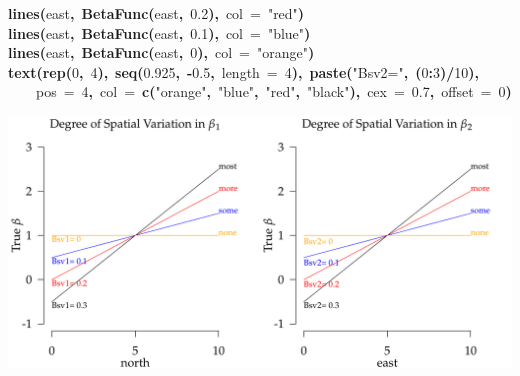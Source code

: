 \documentclass{article}
\makeatletter
\newcommand{\hlnumber}[1]{\textcolor[rgb]{0,0,0}{#1}}%
\newcommand{\hlfunctioncall}[1]{\textcolor[rgb]{0.501960784313725,0,0.329411764705882}{\textbf{#1}}}%
\newcommand{\hlstring}[1]{\textcolor[rgb]{0.6,0.6,1}{#1}}%
\newcommand{\hlkeyword}[1]{\textcolor[rgb]{0,0,0}{\textbf{#1}}}%
\newcommand{\hlargument}[1]{\textcolor[rgb]{0.690196078431373,0.250980392156863,0.0196078431372549}{#1}}%
\newcommand{\hlsymbol}[1]{\textcolor[rgb]{0,0,0}{#1}}%
\newcommand{\hlstd}[1]{\textcolor[rgb]{0,0,0}{#1}}%
\newenvironment{kframe}{%
 \def\FrameCommand##1{\hskip\@totalleftmargin \hskip-\fboxsep
 \colorbox{shadecolor}{##1}\hskip-\fboxsep
     \hskip-\linewidth \hskip-\@totalleftmargin \hskip\columnwidth}%
 \MakeFramed {\advance\hsize-\width
   \@totalleftmargin\z@ \linewidth\hsize
   \@setminipage}}%
 {\par\unskip\endMakeFramed}
\newenvironment{knitrout}{}{} %
\makeatother
\begin{document}
\begin{knitrout}
\begin{kframe}
\begin{flushleft}
\hlstd{}\hlfunctioncall{lines}\hlkeyword{(}\hlsymbol{east}\hlkeyword{,}{\ }\hlfunctioncall{BetaFunc}\hlkeyword{(}\hlsymbol{east}\hlkeyword{,}{\ }\hlnumber{0.2}\hlkeyword{)}\hlkeyword{,}{\ }\hlargument{col}{\ }\hlargument{=}{\ }\hlstring{"{}red"{}}\hlkeyword{)}\hspace*{\fill}\\
\hlstd{}\hlfunctioncall{lines}\hlkeyword{(}\hlsymbol{east}\hlkeyword{,}{\ }\hlfunctioncall{BetaFunc}\hlkeyword{(}\hlsymbol{east}\hlkeyword{,}{\ }\hlnumber{0.1}\hlkeyword{)}\hlkeyword{,}{\ }\hlargument{col}{\ }\hlargument{=}{\ }\hlstring{"{}blue"{}}\hlkeyword{)}\hspace*{\fill}\\
\hlstd{}\hlfunctioncall{lines}\hlkeyword{(}\hlsymbol{east}\hlkeyword{,}{\ }\hlfunctioncall{BetaFunc}\hlkeyword{(}\hlsymbol{east}\hlkeyword{,}{\ }\hlnumber{0}\hlkeyword{)}\hlkeyword{,}{\ }\hlargument{col}{\ }\hlargument{=}{\ }\hlstring{"{}orange"{}}\hlkeyword{)}\hspace*{\fill}\\
\hlstd{}\hlfunctioncall{text}\hlkeyword{(}\hlfunctioncall{rep}\hlkeyword{(}\hlnumber{0}\hlkeyword{,}{\ }\hlnumber{4}\hlkeyword{)}\hlkeyword{,}{\ }\hlfunctioncall{seq}\hlkeyword{(}\hlnumber{0.925}\hlkeyword{,}{\ }\hlkeyword{-}\hlnumber{0.5}\hlkeyword{,}{\ }\hlargument{length}{\ }\hlargument{=}{\ }\hlnumber{4}\hlkeyword{)}\hlkeyword{,}{\ }\hlfunctioncall{paste}\hlkeyword{(}\hlstring{"{}Bsv2="{}}\hlkeyword{,}{\ }\hlkeyword{(}\hlnumber{0}\hlkeyword{:}\hlnumber{3}\hlkeyword{)}\hlkeyword{/}\hlnumber{10}\hlkeyword{)}\hlkeyword{,}\hspace*{\fill}\\
\hlstd{}{\ }{\ }{\ }{\ }\hlargument{pos}{\ }\hlargument{=}{\ }\hlnumber{4}\hlkeyword{,}{\ }\hlargument{col}{\ }\hlargument{=}{\ }\hlfunctioncall{c}\hlkeyword{(}\hlstring{"{}orange"{}}\hlkeyword{,}{\ }\hlstring{"{}blue"{}}\hlkeyword{,}{\ }\hlstring{"{}red"{}}\hlkeyword{,}{\ }\hlstring{"{}black"{}}\hlkeyword{)}\hlkeyword{,}{\ }\hlargument{cex}{\ }\hlargument{=}{\ }\hlnumber{0.7}\hlkeyword{,}{\ }\hlargument{offset}{\ }\hlargument{=}{\ }\hlnumber{0}\hlkeyword{)}\mbox{}
\normalfont
\end{flushleft}
\end{kframe}\includegraphics{figure/SpatVarBeta} 
\end{knitrout}
\end{document}
